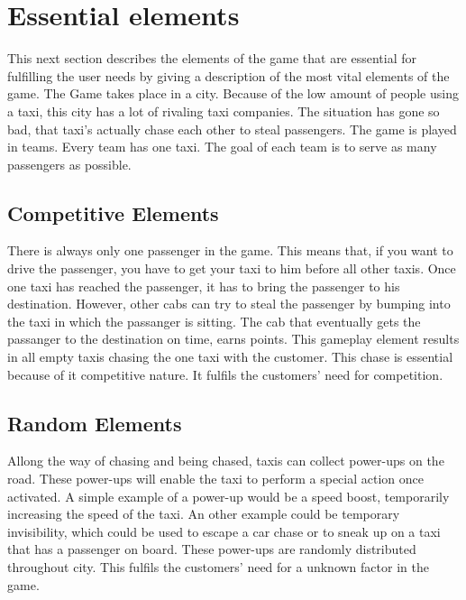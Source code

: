 \documentclass[11pt]{article}
\begin{document}
\section{Essential elements}

This next section describes the elements of the game that are essential for fulfilling the user needs by giving a description of the most vital elements of the game. The Game takes place in a city. Because of the low amount of people using a taxi, this city has a lot of rivaling taxi companies. The situation has gone so bad, that taxi's actually chase each other to steal passengers. The game is played in teams. Every team has one taxi. The goal of each team is to serve as many passengers as possible.


\subsection{Competitive Elements}
There is always only one passenger in the game. This means that, if you want to drive the passenger, you have to get your taxi to him before all other taxis. Once one taxi has reached the passenger, it has to bring the passenger to his destination. However, other cabs can try to steal the passenger by bumping into the taxi in which the passanger is sitting. The cab that eventually gets the passanger to the destination on time, earns points. This gameplay element results in all empty taxis chasing the one taxi with the customer. This chase is essential because of it competitive nature. It fulfils the customers' need for competition. 

\subsection{Random Elements}

Allong the way of chasing and being chased, taxis can collect power-ups on the road. These power-ups will enable the taxi to perform a special action once activated. A simple example of a power-up would be a speed boost, temporarily increasing the speed of the taxi. An other example could be temporary invisibility, which could be used to escape a car chase or to sneak up on a taxi that has a passenger on board. These power-ups are randomly distributed throughout city. This fulfils the customers' need for a unknown factor in the game. 
\end{document}
